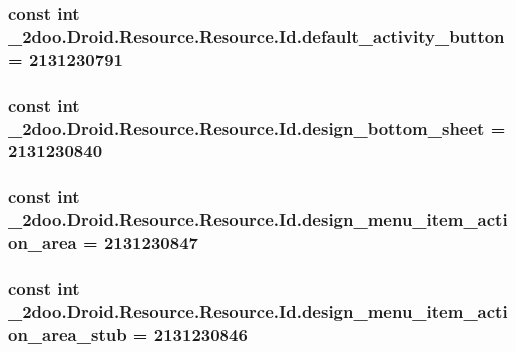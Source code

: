 \hypertarget{class__2doo_1_1_droid_1_1_resource_1_1_id_8c9a9660545ebf4644634126f147b421}{
\subsubsection[{default\_\-activity\_\-button}]{\setlength{\rightskip}{0pt plus 5cm}const int \_\-2doo.Droid.Resource.Resource.Id.default\_\-activity\_\-button = 2131230791}}
\label{class__2doo_1_1_droid_1_1_resource_1_1_id_8c9a9660545ebf4644634126f147b421}


\hypertarget{class__2doo_1_1_droid_1_1_resource_1_1_id_900556784946a5c06f81fe9d9ee95752}{
\subsubsection[{design\_\-bottom\_\-sheet}]{\setlength{\rightskip}{0pt plus 5cm}const int \_\-2doo.Droid.Resource.Resource.Id.design\_\-bottom\_\-sheet = 2131230840}}
\label{class__2doo_1_1_droid_1_1_resource_1_1_id_900556784946a5c06f81fe9d9ee95752}


\hypertarget{class__2doo_1_1_droid_1_1_resource_1_1_id_98637190fea89dcbe9fc8bb45901962d}{
\subsubsection[{design\_\-menu\_\-item\_\-action\_\-area}]{\setlength{\rightskip}{0pt plus 5cm}const int \_\-2doo.Droid.Resource.Resource.Id.design\_\-menu\_\-item\_\-action\_\-area = 2131230847}}
\label{class__2doo_1_1_droid_1_1_resource_1_1_id_98637190fea89dcbe9fc8bb45901962d}


\hypertarget{class__2doo_1_1_droid_1_1_resource_1_1_id_1557d1bfdff6a80edb347d38d384511a}{
\subsubsection[{design\_\-menu\_\-item\_\-action\_\-area\_\-stub}]{\setlength{\rightskip}{0pt plus 5cm}const int \_\-2doo.Droid.Resource.Resource.Id.design\_\-menu\_\-item\_\-action\_\-area\_\-stub = 2131230846}}
\label{class__2doo_1_1_droid_1_1_resource_1_1_id_1557d1bfdff6a80edb347d38d384511a}


